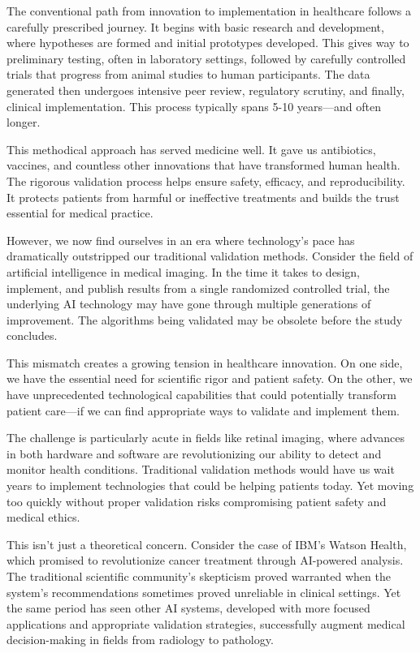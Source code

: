 \documentclass[
  Letterpaper,
]{scrbook}
\begin{document}
The conventional path from innovation to implementation in healthcare
follows a carefully prescribed journey. It begins with basic research
and development, where hypotheses are formed and initial prototypes
developed. This gives way to preliminary testing, often in laboratory
settings, followed by carefully controlled trials that progress from
animal studies to human participants. The data generated then undergoes
intensive peer review, regulatory scrutiny, and finally, clinical
implementation. This process typically spans 5-10 years---and often
longer.

This methodical approach has served medicine well. It gave us
antibiotics, vaccines, and countless other innovations that have
transformed human health. The rigorous validation process helps ensure
safety, efficacy, and reproducibility. It protects patients from harmful
or ineffective treatments and builds the trust essential for medical
practice.

However, we now find ourselves in an era where technology's pace has
dramatically outstripped our traditional validation methods. Consider
the field of artificial intelligence in medical imaging. In the time it
takes to design, implement, and publish results from a single randomized
controlled trial, the underlying AI technology may have gone through
multiple generations of improvement. The algorithms being validated may
be obsolete before the study concludes.

This mismatch creates a growing tension in healthcare innovation. On one
side, we have the essential need for scientific rigor and patient
safety. On the other, we have unprecedented technological capabilities
that could potentially transform patient care---if we can find
appropriate ways to validate and implement them.

The challenge is particularly acute in fields like retinal imaging,
where advances in both hardware and software are revolutionizing our
ability to detect and monitor health conditions. Traditional validation
methods would have us wait years to implement technologies that could be
helping patients today. Yet moving too quickly without proper validation
risks compromising patient safety and medical ethics.

This isn't just a theoretical concern. Consider the case of IBM's Watson
Health, which promised to revolutionize cancer treatment through
AI-powered analysis. The traditional scientific community's skepticism
proved warranted when the system's recommendations sometimes proved
unreliable in clinical settings. Yet the same period has seen other AI
systems, developed with more focused applications and appropriate
validation strategies, successfully augment medical decision-making in
fields from radiology to pathology.
\end{document}
